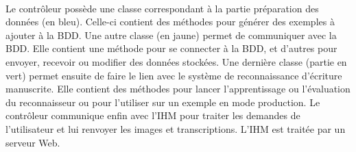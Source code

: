 \paragraph{}

Le contrôleur possède une classe correspondant à la partie préparation des données (en bleu). Celle-ci contient des méthodes pour générer des exemples à ajouter à la BDD. Une autre classe (en jaune) permet de communiquer avec la BDD. Elle contient une méthode pour se connecter à la BDD, et d’autres pour envoyer, recevoir ou modifier des données stockées. Une dernière classe (partie en vert) permet ensuite de faire le lien avec le système de reconnaissance d’écriture manuscrite. Elle contient des méthodes pour lancer l’apprentissage ou l’évaluation du reconnaisseur ou pour l’utiliser sur un exemple en mode production.
Le contrôleur communique enfin avec l’IHM pour traiter les demandes de l’utilisateur et lui renvoyer les images et transcriptions. L’IHM est traitée par un serveur Web.


